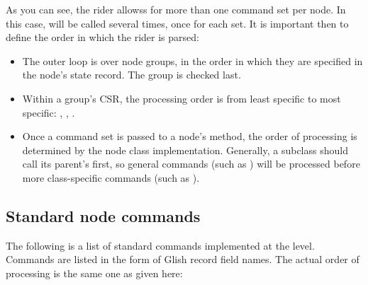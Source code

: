   As you can see, the rider allowss for more than one command set per node. In
  this case,  will be called several times, once for each
  set. It is important then to define the order in which the rider is parsed:

  \begin{itemize}
  
  \item The outer loop is over node groups, in the order in which they are
  specified in the node's state record. The  group is checked last.

  \item Within a group's CSR, the processing order is from least specific to
  most specific: , ,
  .

  \item Once a command set is passed to a node's  method,
  the order of processing is determined by the node class implementation.
  Generally, a subclass should call its parent's  first,
  so general commands (such as ) will be processed before more
  class-specific commands (such as ).

  \end{itemize}
  
\subsection{Standard node commands}
\label{sec:commands-Node}

  The following is a list of standard commands implemented at the 
  level. Commands are listed in the form of Glish record field names. 
  The actual order of processing is the same one as given here:
  
